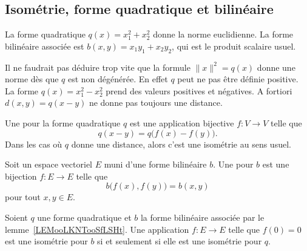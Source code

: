\subsection{Isométrie, forme quadratique et bilinéaire}

\begin{example}
    La forme quadratique \( q(x)=x_1^2+x_2^2\) donne la norme euclidienne. La forme bilinéaire associée est \( b(x,y)=x_1y_1+x_2y_2\), qui est le produit scalaire usuel.
\end{example}

Il ne faudrait pas déduire trop vite que la formule \( \| x \|^2=q(x)\) donne une norme dès que \( q\) est non dégénérée. En effet \( q\) peut ne pas être définie positive. La forme \( q(x)=x_1^2-x_2^2\) prend des valeurs positives et négatives. A fortiori \( d(x,y)=q(x-y)\) ne donne pas toujours une distance.

\begin{definition}      \label{DEFooECTUooRxBhHf}
    Une  pour la forme quadratique \( q\) est une application bijective \( f\colon V\to V\) telle que 
    \begin{equation}
     q(x-y)=q\big( f(x)-f(y) \big).
    \end{equation}
     Dans les cas où \( q\) donne une distance, alors c'est une isométrie au sens usuel.
\end{definition}

\begin{definition}      \label{DEFooIQURooMeQuqX}
    Soit un espace vectoriel \( E\) muni d'une forme bilinéaire \( b\). Une  pour \( b\) est une bijection \( f\colon E\to E\) telle que
    \begin{equation}
        b\big( f(x),f(y) \big)=b(x,y)
    \end{equation}
    pour tout \( x,y\in E\).
\end{definition}

\begin{lemma}   \label{LemewGJmM}
    Soient \( q\) une forme quadratique et \( b\) la forme bilinéaire associée par le lemme~\ref{LEMooLKNTooSfLSHt}. Une application \( f\colon E\to E\) telle que \( f(0)=0\) est une isométrie pour \( b\) si et seulement si elle est une isométrie pour \( q\).
\end{lemma}

